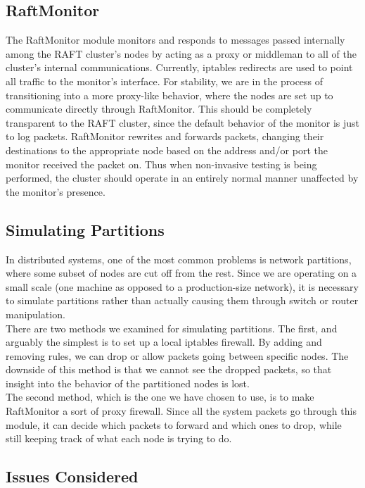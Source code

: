 \documentclass[UTF8]{article}
\begin{document}
\subsection{RaftMonitor}

The RaftMonitor module monitors and responds to messages passed internally among the RAFT cluster's nodes by acting as a proxy or middleman to all of the cluster's internal communications. Currently, iptables redirects are used to point all traffic to the monitor's interface. For stability, we are in the process of transitioning into a more proxy-like behavior, where the nodes are set up to communicate directly through RaftMonitor. This should be completely transparent to the RAFT cluster, since the default behavior of the monitor is just to log packets. RaftMonitor rewrites and forwards packets, changing their destinations to the appropriate node based on the address and/or port the monitor received the packet on. Thus when non-invasive testing is being performed, the cluster should operate in an entirely normal manner unaffected by the monitor's presence.

\subsection{Simulating Partitions}

In distributed systems, one of the most common problems is network partitions, where some subset of nodes are cut off from the rest. Since we are operating on a small scale (one machine as opposed to a production-size network), it is necessary to simulate partitions rather than actually causing them through switch or router manipulation.
\\ \indent There are two methods we examined for simulating partitions. The first, and arguably the simplest is to set up a local iptables firewall. By adding and removing rules, we can drop or allow packets going between specific nodes. The downside of this method is that we cannot see the dropped packets, so that insight into the behavior of the partitioned nodes is lost.
\\ \indent The second method, which is the one we have chosen to use, is to make RaftMonitor a sort of proxy firewall. Since all the system packets go through this module, it can decide which packets to forward and which ones to drop, while still keeping track of what each node is trying to do.

\subsection{Issues Considered}
\end{document}

